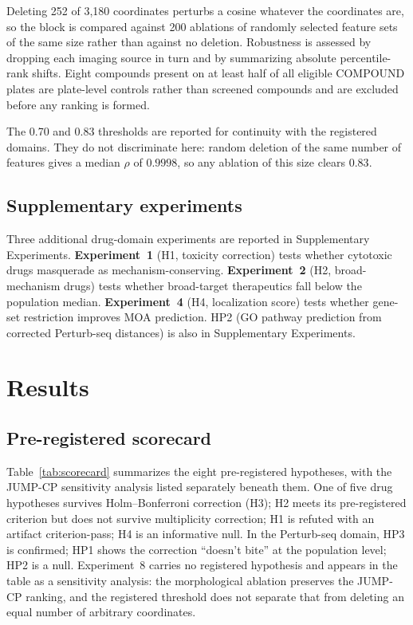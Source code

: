 \documentclass[11pt]{article}
\begin{document}
Deleting 252 of 3{,}180 coordinates perturbs a cosine whatever the
coordinates are, so the block is compared against 200 ablations of randomly
selected feature sets of the same size rather than against no deletion.
Robustness is assessed by dropping each imaging source in turn and by
summarizing absolute percentile-rank shifts. Eight compounds present on at
least half of all eligible COMPOUND plates are plate-level controls rather
than screened compounds and are excluded before any ranking is formed.

The 0.70 and 0.83 thresholds are reported for continuity with the registered
domains. They do not discriminate here: random deletion of the same number of
features gives a median $\rho$ of $0.9998$, so any ablation of this size
clears $0.83$.

\subsection{Supplementary experiments}

Three additional drug-domain experiments are reported in Supplementary
Experiments. \textbf{Experiment~1}
(H1, toxicity correction) tests whether cytotoxic drugs masquerade as
mechanism-conserving. \textbf{Experiment~2} (H2, broad-mechanism drugs)
tests whether broad-target therapeutics fall below the population median.
\textbf{Experiment~4} (H4, localization score) tests whether gene-set
restriction improves MOA prediction. HP2 (GO pathway prediction from
corrected Perturb-seq distances) is also in Supplementary Experiments.

\section{Results}

\subsection{Pre-registered scorecard}

Table~\ref{tab:scorecard} summarizes the eight pre-registered hypotheses,
with the JUMP-CP sensitivity analysis listed separately beneath them.
One of five drug hypotheses survives Holm--Bonferroni correction (H3);
H2 meets its pre-registered criterion but does not survive multiplicity
correction; H1 is refuted with an artifact criterion-pass; H4 is an
informative null.
In the Perturb-seq domain, HP3 is confirmed; HP1 shows the correction
``doesn't bite'' at the population level; HP2 is a null. Experiment~8 carries
no registered hypothesis and appears in the table as a sensitivity analysis:
the morphological ablation preserves the JUMP-CP ranking, and the registered
threshold does not separate that from deleting an equal number of arbitrary
coordinates.
\end{document}
